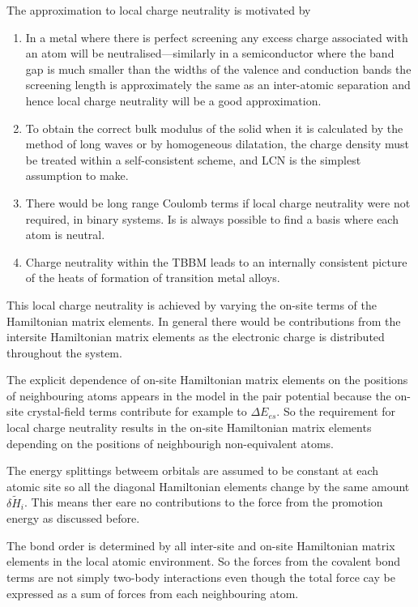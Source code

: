 \documentclass[11pt]{article}
\begin{document}
\begin{enumerate}
\begin{enumerate}
\begin{enumerate}
The approximation to local charge neutrality is motivated by 
\begin{enumerate}
\item In a metal where there is perfect screening any excess charge associated
with an atom will be neutralised---similarly in a semiconductor where the
band gap is much smaller than the widths of the valence and conduction
bands the screening length is approximately the same as an inter-atomic
separation and hence local charge neutrality will be a good
approximation.
\item To obtain the correct bulk modulus of the solid when it is calculated by
the method of long waves or by homogeneous dilatation, the charge density
must be treated within a self-consistent scheme, and LCN is the simplest
assumption to make.
\item There would be long range Coulomb terms if local charge neutrality were
not required, in binary systems. Is is always possible to find a basis
where each atom is neutral.
\item Charge neutrality within the TBBM leads to an internally consistent
picture of the heats of formation of transition metal alloys.
\end{enumerate}

This local charge neutrality is achieved by varying the on-site terms of the
Hamiltonian matrix elements. In general there would be contributions from the
intersite Hamiltonian matrix elements as the electronic charge is distributed
throughout the system. 

The explicit dependence of on-site Hamiltonian matrix elements on the
positions of neighbouring atoms appears in the model in the pair potential
because the on-site crystal-field terms contribute for example to \(\Delta
E_{es}\). So the requirement for local charge neutrality results in the
on-site Hamiltonian matrix elements depending on the positions of neighbourigh
non-equivalent atoms. 

The energy splittings betweem orbitals are assumed to be constant at each
atomic site so all the diagonal Hamiltonian elements change by the same amount
\(\delta \widetilde{H}_{i}\). This means ther eare no contributions to the force
from the promotion energy as discussed before. 

The bond order is determined by all inter-site and on-site Hamiltonian matrix
elements in the local atomic environment. So the forces from the covalent bond
terms are not simply two-body interactions even though the total force cay be
expressed as a sum of forces from each neighbouring atom. 


\end{enumerate}
\end{enumerate}
\end{enumerate}
\end{document}
